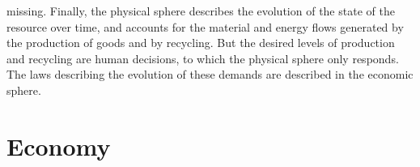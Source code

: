 \documentclass[12pt,a4paper]{article}%
\begin{document}
\begin{appendix}
missing.  Finally, the physical sphere describes the evolution of the state of the resource over time, and accounts for the material and energy flows generated by the production of goods and by recycling. But the desired levels of production and recycling are human decisions, to which the physical sphere only responds. The laws describing the evolution of these demands are described in the economic sphere. 

\section{Economy}
\end{appendix}
\end{document}
